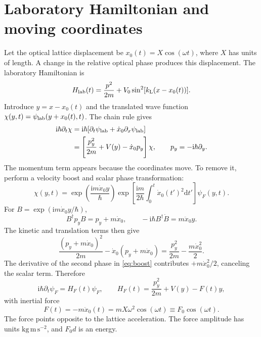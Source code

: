 \documentclass[11pt,oneside]{report}
\numberwithin{equation}{chapter}
\newcommand{\ii}{\mathrm i}
\newcommand{\dd}{\mathrm d}
\begin{document}
\section{Laboratory Hamiltonian and moving coordinates}
Let the optical lattice displacement be $x_0(t)=X\cos(\omega t)$, where $X$ has units of length. A change in the relative optical phase produces this displacement. The laboratory Hamiltonian is
\begin{equation}\label{eq:lab}
 H_{\rm lab}(t)=\frac{p^2}{2m}+V_0\sin^2[k_{\mathrm L}(x-x_0(t))].
\end{equation}
Introduce $y=x-x_0(t)$ and the translated wave function $\chi(y,t)=\psi_{\rm lab}(y+x_0(t),t)$. The chain rule gives
\begin{align}
 \ii\hbar\partial_t\chi
 &=\ii\hbar[\partial_t\psi_{\rm lab}+\dot x_0\partial_x\psi_{\rm lab}]\nonumber\\
 &=\left[\frac{p_y^2}{2m}+V(y)-\dot x_0p_y\right]\chi,\qquad p_y=-\ii\hbar\partial_y.\label{eq:translated}
\end{align}
The momentum term appears because the coordinates move. To remove it, perform a velocity boost and scalar phase transformation:
\begin{equation}\label{eq:boost}
 \chi(y,t)=\exp\!\left(\frac{\ii m\dot x_0 y}{\hbar}\right)
 \exp\!\left[\frac{\ii m}{2\hbar}\int_0^t\dot x_0(t')^2\dd t'\right]\psi_F(y,t).
\end{equation}
For $B=\exp(\ii m\dot x_0y/\hbar)$,
\begin{equation}
 B^\dagger p_y B=p_y+m\dot x_0,\qquad
 -\ii\hbar B^\dagger\dot B=m\ddot x_0y.
\end{equation}
The kinetic and translation terms then give
\begin{equation}
 \frac{(p_y+m\dot x_0)^2}{2m}-\dot x_0(p_y+m\dot x_0)
 =\frac{p_y^2}{2m}-\frac{m\dot x_0^2}{2}.
\end{equation}
The derivative of the second phase in \cref{eq:boost} contributes $+m\dot x_0^2/2$, canceling the scalar term. Therefore
\begin{equation}\label{eq:forceH}
 \ii\hbar\partial_t\psi_F=H_F(t)\psi_F,\qquad
 H_F(t)=\frac{p_y^2}{2m}+V(y)-F(t)y,
\end{equation}
with inertial force
\begin{equation}\label{eq:force}
 F(t)=-m\ddot x_0(t)=mX\omega^2\cos(\omega t)\equiv F_0\cos(\omega t).
\end{equation}
The force points opposite to the lattice acceleration. The force amplitude has units $\mathrm{kg\,m\,s^{-2}}$, and $F_0d$ is an energy.
\end{document}
